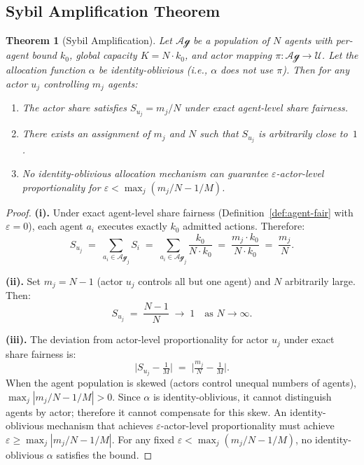 \documentclass[11pt]{article}
\theoremstyle{plain}
\newtheorem{theorem}{Theorem}[section]
\theoremstyle{definition}
\theoremstyle{remark}
\newcommand{\Agents}{\mathcal{Ag}}         %
\newcommand{\Actors}{\mathcal{U}}          %
\newcommand{\Share}[1]{S_{#1}}             %
\newcommand{\kbound}{k_0}                  %
\newcommand{\Kcap}{K}                      %
\newcommand{\alloc}{\alpha}                %
\newcommand{\owner}{\pi}                   %
\begin{document}
\subsection{Sybil Amplification Theorem}

\begin{theorem}[Sybil Amplification]
\label{thm:sybil}
Let $\Agents$ be a population of $N$ agents with per-agent bound
$\kbound$, global capacity $\Kcap = N \cdot \kbound$, and actor
mapping $\owner : \Agents \to \Actors$.  Let the allocation function
$\alloc$ be identity-oblivious (i.e., $\alloc$ does not use $\owner$).
Then for any actor $u_j$ controlling $m_j$ agents:
\begin{enumerate}[label=(\roman*)]
  \item The actor share satisfies
    $\Share{u_j} = m_j / N$
    under exact agent-level share fairness.
  \item There exists an assignment of $m_j$ and $N$ such that
    $\Share{u_j}$ is arbitrarily close to~$1$.
  \item No identity-oblivious allocation mechanism can guarantee
    $\varepsilon$-actor-level proportionality for
    $\varepsilon < \max_j (m_j/N - 1/M)$.
\end{enumerate}
\end{theorem}

\begin{proof}
\textbf{(i).}  Under exact agent-level share fairness
(Definition~\ref{def:agent-fair} with $\varepsilon = 0$), each agent
$a_i$ executes exactly $\kbound$ admitted actions.  Therefore:
\[
  \Share{u_j} \;=\;
  \sum_{a_i \in \Agents_j} \Share{i} \;=\;
  \sum_{a_i \in \Agents_j} \frac{\kbound}{N \cdot \kbound} \;=\;
  \frac{m_j \cdot \kbound}{N \cdot \kbound} \;=\; \frac{m_j}{N}.
\]

\textbf{(ii).}  Set $m_j = N - 1$ (actor $u_j$ controls all but one
agent) and $N$ arbitrarily large.  Then:
\[
  \Share{u_j} \;=\; \frac{N-1}{N} \;\to\; 1 \quad \text{as } N \to \infty.
\]

\textbf{(iii).}  The deviation from actor-level proportionality for
actor $u_j$ under exact share fairness is:
\[
  \bigl|\Share{u_j} - \tfrac{1}{M}\bigr|
  \;=\; \bigl|\tfrac{m_j}{N} - \tfrac{1}{M}\bigr|.
\]
When the agent population is skewed (actors control unequal numbers of
agents), $\max_j |m_j/N - 1/M| > 0$.  Since $\alloc$ is
identity-oblivious, it cannot distinguish agents by actor; therefore
it cannot compensate for this skew.  An identity-oblivious mechanism
that achieves $\varepsilon$-actor-level proportionality must achieve
$\varepsilon \geq \max_j |m_j/N - 1/M|$.  For any fixed $\varepsilon
< \max_j(m_j/N - 1/M)$, no identity-oblivious $\alloc$ satisfies
the bound.
\end{proof}
\end{document}
